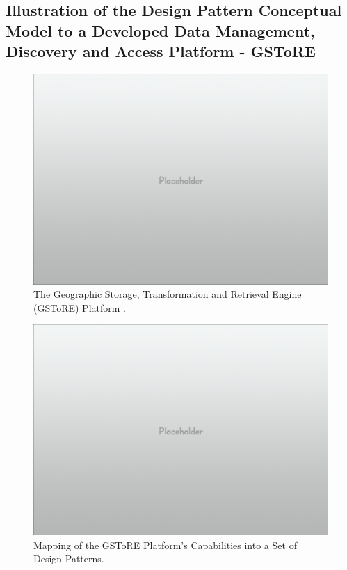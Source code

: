 \documentclass[final]{beamer}
\begin{document}
\begin{frame}[t]
\begin{multicols}{3}
\section{Illustration of the Design Pattern Conceptual Model to a
Developed Data Management, Discovery and Access Platform -
GSToRE}\label{illustration-of-the-design-pattern-conceptual-model-to-a-developed-data-management-discovery-and-access-platform---gstore}

\begin{figure}[htbp]
\centering
\includegraphics{placeholder.png}
\caption{The Geographic Storage, Transformation and Retrieval Engine
(GSToRE) Platform .}
\end{figure}

\begin{figure}[htbp]
\centering
\includegraphics{placeholder.png}
\caption{Mapping of the GSToRE Platform's Capabilities into a Set of
Design Patterns.}
\end{figure}


\end{multicols}
\end{frame}
\end{document}
